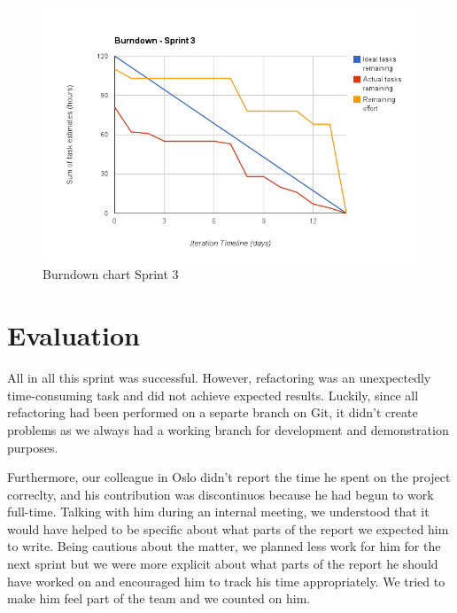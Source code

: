 \begin{figure}[h]
\centering
\includegraphics[scale=0.60]{../Figures/burndownSprint3.png}
\caption{Burndown chart Sprint 3}
\label{figure:burndownsprint3}
\end{figure}

\section{Evaluation}

All in all this sprint was successful.
However, refactoring was an unexpectedly time-consuming task and did not achieve expected results.
Luckily, since all refactoring had been performed on a separte branch on Git, it didn't create
problems as we always had a working branch for development and demonstration purposes.

Furthermore, our colleague in Oslo didn't report the time he spent on the project correclty,
and his contribution was discontinuos because he had begun to work full-time.
Talking with him during an internal meeting, we understood that it would have helped to be specific
about what parts of the report we expected him to write. Being cautious about the matter,
we planned less work for him for the next sprint but we were more explicit about what parts
of the report he should have worked on and encouraged him to track his time appropriately.
We tried to make him feel part of the team and we counted on him.


